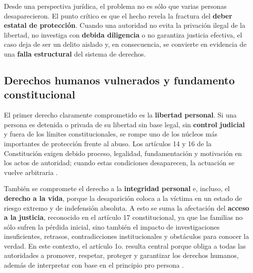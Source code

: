 \documentclass[
	spanish,
	letterpaper, oneside
]{article}
\begin{document}
\noindent{}

Desde una perspectiva jurídica, el problema no es sólo que varias personas desaparecieron. El punto crítico es que el hecho revela la fractura del \textbf{deber estatal de protección}. Cuando una autoridad no evita la privación ilegal de la libertad, no investiga con \textbf{debida diligencia} o no garantiza justicia efectiva, el caso deja de ser un delito aislado y, en consecuencia, se convierte en evidencia de una \textbf{falla estructural} del sistema de derechos.

\subsection{Derechos humanos vulnerados y fundamento constitucional}

El primer derecho claramente comprometido es la \textbf{libertad personal}. Si una persona es detenida o privada de su libertad sin base legal, sin \textbf{control judicial} y fuera de los límites constitucionales, se rompe uno de los núcleos más importantes de protección frente al abuso. Los artículos 14 y 16 de la Constitución exigen debido proceso, legalidad, fundamentación y motivación en los actos de autoridad; cuando estas condiciones desaparecen, la actuación se vuelve arbitraria \citep{constitucionCPEUM2026}.

También se compromete el derecho a la \textbf{integridad personal} e, incluso, el \textbf{derecho a la vida}, porque la desaparición coloca a la víctima en un estado de riesgo extremo y de indefensión absoluta. A esto se suma la afectación del \textbf{acceso a la justicia}, reconocido en el artículo 17 constitucional, ya que las familias no sólo sufren la pérdida inicial, sino también el impacto de investigaciones insuficientes, retrasos, contradicciones institucionales y obstáculos para conocer la verdad. En este contexto, el artículo 1o. resulta central porque obliga a todas las autoridades a promover, respetar, proteger y garantizar los derechos humanos, además de interpretar con base en el principio pro persona \citep{constitucionCPEUM2026}.
\end{document}

